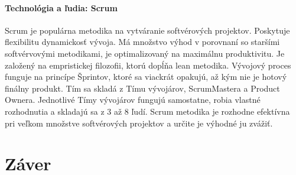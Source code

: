 \documentclass[10pt,slovak,a4paper]{article}
\begin{document}
\paragraph{Technológia a ľudia: Scrum}
Scrum je populárna metodika na vytváranie softvérových projektov. Poskytuje flexibilitu dynamickosť vývoja. Má množstvo výhod v porovnaní so staršími softvérvovými metodikami, je optimalizovaný na maximálnu produktivitu. Je založený na empristickej filozofii, ktorú dopĺňa lean metodika. Vývojový proces funguje na princípe Šprintov, ktoré sa viackrát opakujú, až kým nie je hotový finálny produkt. Tím sa skladá z Tímu vývojárov, ScrumMastera a Product Ownera. Jednotlivé Tímy vývojárov fungujú samostatne, robia vlastné rozhodnutia a skladajú sa z 3 až 8 ľudí. Scrum metodika je rozhodne efektívna pri veľkom množstve softvérových projektov a určite je výhodné ju zvážiť. 


\section{Záver} \label{zaver}




\end{document}
